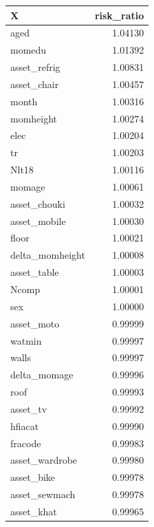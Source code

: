 \documentclass[12pt, krantz2,]{krantz}
\newenvironment{Shaded}{\begin{snugshade}}{\end{snugshade}}
\newcommand{\ControlFlowTok}[1]{\textcolor[rgb]{0.27,0.27,0.27}{\textbf{#1}}}
\newcommand{\DataTypeTok}[1]{\textcolor[rgb]{0.27,0.27,0.27}{#1}}
\newcommand{\KeywordTok}[1]{\textcolor[rgb]{0.27,0.27,0.27}{\textbf{#1}}}
\newcommand{\NormalTok}[1]{#1}
\newcommand{\OperatorTok}[1]{\textcolor[rgb]{0.43,0.43,0.43}{\textbf{#1}}}
\newcommand{\OtherTok}[1]{\textcolor[rgb]{0.37,0.37,0.37}{#1}}
\newcommand{\StringTok}[1]{\textcolor[rgb]{0.5,0.5,0.5}{#1}}
\theoremstyle{definition}
\theoremstyle{definition}
\theoremstyle{definition}
\newcommand{\1}{\mathbbm{1}}
\begin{document}
\begin{Shaded}
\end{Shaded}

\begin{tabular}{l|r}
\hline
X & risk\_ratio\\
\hline
aged & 1.04130\\
\hline
momedu & 1.01392\\
\hline
asset\_refrig & 1.00831\\
\hline
asset\_chair & 1.00457\\
\hline
month & 1.00316\\
\hline
momheight & 1.00274\\
\hline
elec & 1.00204\\
\hline
tr & 1.00203\\
\hline
Nlt18 & 1.00116\\
\hline
momage & 1.00061\\
\hline
asset\_chouki & 1.00032\\
\hline
asset\_mobile & 1.00030\\
\hline
floor & 1.00021\\
\hline
delta\_momheight & 1.00008\\
\hline
asset\_table & 1.00003\\
\hline
Ncomp & 1.00001\\
\hline
sex & 1.00000\\
\hline
asset\_moto & 0.99999\\
\hline
watmin & 0.99997\\
\hline
walls & 0.99997\\
\hline
delta\_momage & 0.99996\\
\hline
roof & 0.99993\\
\hline
asset\_tv & 0.99992\\
\hline
hfiacat & 0.99990\\
\hline
fracode & 0.99983\\
\hline
asset\_wardrobe & 0.99980\\
\hline
asset\_bike & 0.99978\\
\hline
asset\_sewmach & 0.99978\\
\hline
asset\_khat & 0.99965\\
\hline
\end{tabular}
\end{document}
